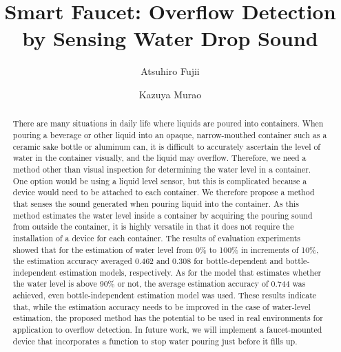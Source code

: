 \documentclass[manuscript,screen,review]{acmart}
\begin{document}
\title{Smart Faucet: Overflow Detection by Sensing Water Drop Sound}

\author{Atsuhiro Fujii}

\author{Kazuya Murao}

\renewcommand{\shortauthors}{Fujii and Murao}

\begin{abstract}
  There are many situations in daily life where liquids are poured into containers. When pouring a beverage or other liquid into an opaque, narrow-mouthed container such as a ceramic sake bottle or aluminum can, it is difficult to accurately ascertain the level of water in the container visually, and the liquid may overflow. Therefore, we need a method other than visual inspection for determining the water level in a container. One option would be using a liquid level sensor, but this is complicated because a device would need to be attached to each container. We therefore propose a method that senses the sound generated when pouring liquid into the container. As this method estimates the water level inside a container by acquiring the pouring sound from outside the container, it is highly versatile in that it does not require the installation of a device for each container. The results of evaluation experiments showed that for the estimation of water level from 0\% to 100\% in increments of 10\%, the estimation accuracy averaged 0.462 and 0.308 for bottle-dependent and bottle-independent estimation models, respectively. As for the model that estimates whether the water level is above 90\% or not, the average estimation accuracy of 0.744 was achieved, even bottle-independent estimation model was used. These results indicate that, while the estimation accuracy needs to be improved in the case of water-level estimation, the proposed method has the potential to be used in real environments for application to overflow detection. In future work, we will implement a faucet-mounted device that incorporates a function to stop water pouring just before it fills up.
\end{abstract}
\end{document}
